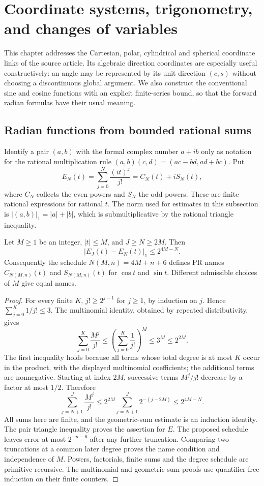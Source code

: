 \section{Coordinate systems, trigonometry, and changes of variables}
\label{sec:coordinates}

This chapter addresses the Cartesian, polar, cylindrical and spherical
coordinate links of the source article. Its algebraic direction coordinates
are especially useful constructively: an angle may be represented by its
unit direction $(c,s)$ without choosing a discontinuous global argument.
We also construct the conventional sine and cosine functions with an
explicit finite-series bound, so that the forward radian formulas have
their usual meaning.

\subsection{Radian functions from bounded rational sums}

Identify a pair $(a,b)$ with the formal complex number $a+ib$ only as
notation for the rational multiplication rule
$(a,b)(c,d)=(ac-bd,ad+bc)$. Put
\[
 E_N(t)=\sum_{j=0}^{N}\frac{(it)^j}{j!}=C_N(t)+iS_N(t),
\]
where $C_N$ collects the even powers and $S_N$ the odd powers. These are
finite rational expressions for rational $t$. The norm used for estimates
in this subsection is $|(a,b)|_1=|a|+|b|$, which is submultiplicative by
the rational triangle inequality.

\begin{lemma}
\label{coord:tail}
Let $M\ge1$ be an integer, $|t|\le M$, and $J\ge N\ge2M$. Then
\[
 |E_J(t)-E_N(t)|_1\le 2^{4M-N}.
\]
Consequently the schedule $N(M,n)=4M+n+6$ defines PR names
$C_{N(M,n)}(t)$ and $S_{N(M,n)}(t)$ for $\cos t$ and $\sin t$.
Different admissible choices of $M$ give equal names.
\end{lemma}
\begin{proof}
For every finite $K$, $j!\ge2^{j-1}$ for $j\ge1$, by induction on $j$.
Hence $\sum_{j=0}^K1/j!\le3$. The multinomial identity, obtained by
repeated distributivity, gives
\[
 \sum_{j=0}^{K}\frac{M^j}{j!}
 \le\left(\sum_{j=0}^{K}\frac1{j!}\right)^M
 \le3^M\le2^{2M}.
\]
The first inequality holds because all terms whose total degree is at
most $K$ occur in the product, with the displayed multinomial coefficients;
the additional terms are nonnegative. Starting at index $2M$, successive
terms $M^j/j!$ decrease by a factor at most $1/2$. Therefore
\[
 \sum_{j=N+1}^{J}\frac{M^j}{j!}
 \le 2^{2M}\sum_{j=N+1}^{J}2^{-(j-2M)}
 \le2^{4M-N}.
\]
All sums here are finite, and the geometric-sum estimate is an induction
identity. The pair triangle inequality proves the assertion for $E$.
The proposed schedule leaves error at most $2^{-n-6}$ after any further
truncation. Comparing two truncations at a common later degree proves
the name condition and independence of $M$. Powers, factorials, finite
sums and the degree schedule are primitive recursive. The multinomial
and geometric-sum proofs use quantifier-free induction on their finite
counters.
\end{proof}

